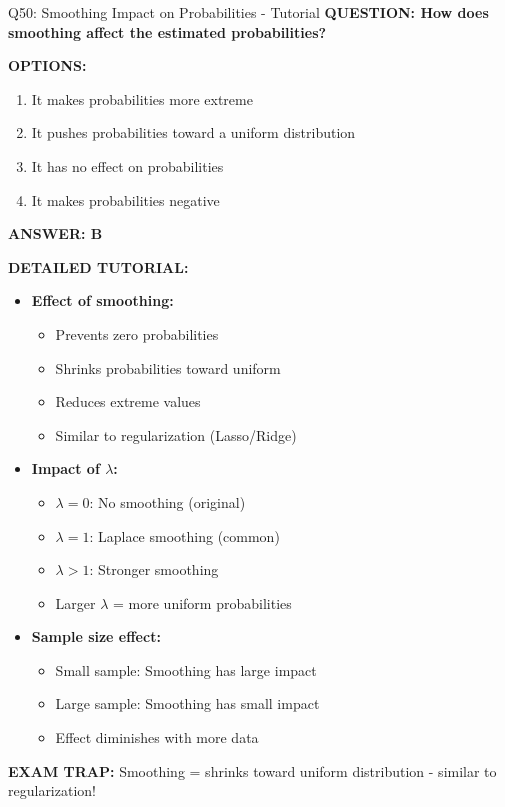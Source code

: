 \documentclass[8pt]{beamer}
\begin{document}
	\begin{frame}{Q50: Smoothing Impact on Probabilities - Tutorial}
		\fontsize{6.5}{7.5}\selectfont
		\textbf{QUESTION: How does smoothing affect the estimated probabilities?}
		
		\vspace{0.1cm}
		\textbf{OPTIONS:}
		\begin{enumerate}
			\item It makes probabilities more extreme
			\item It pushes probabilities toward a uniform distribution
			\item It has no effect on probabilities
			\item It makes probabilities negative
		\end{enumerate}
		
		\vspace{0.1cm}
		\textcolor{myblue}{\textbf{ANSWER: B}}
		
		\vspace{0.1cm}
		\textbf{DETAILED TUTORIAL:}
		\begin{itemize}
			\item \textbf{Effect of smoothing:}
			\begin{itemize}
				\item Prevents zero probabilities
				\item Shrinks probabilities toward uniform
				\item Reduces extreme values
				\item Similar to regularization (Lasso/Ridge)
			\end{itemize}
			\item \textbf{Impact of $\lambda$:}
			\begin{itemize}
				\item $\lambda = 0$: No smoothing (original)
				\item $\lambda = 1$: Laplace smoothing (common)
				\item $\lambda > 1$: Stronger smoothing
				\item Larger $\lambda$ = more uniform probabilities
			\end{itemize}
			\item \textbf{Sample size effect:}
			\begin{itemize}
				\item Small sample: Smoothing has large impact
				\item Large sample: Smoothing has small impact
				\item Effect diminishes with more data
			\end{itemize}
		\end{itemize}
		
		\textcolor{myred}{\textbf{EXAM TRAP:}} Smoothing = \textcolor{myblue}{shrinks toward uniform distribution} - similar to regularization!
	\end{frame}
	
\end{document}
